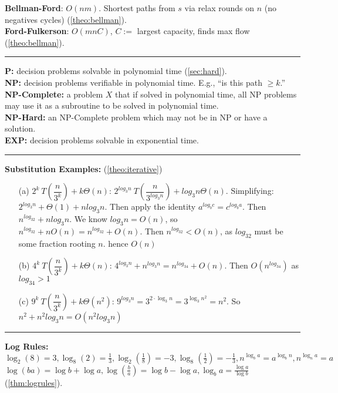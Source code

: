 \textbf{Bellman-Ford}: $O(nm)$. Shortest paths from $s$ via relax rounds on $n$ (no negatives cycles) (\ref{theo:bellman}).\\
\textbf{Ford-Fulkerson}: $O(mnC)$, $C:=$ largest capacity, finds max flow (\ref{theo:bellman}).\\
\noindent\rule{\textwidth}{0.4pt}
\textbf{P:} decision problems solvable in polynomial time (\ref{sec:hard}).\\
\textbf{NP:} decision problems verifiable in polynomial time. E.g., ``is this path $\geq k$.''\\
\textbf{NP-Complete:} a problem $X$ that if solved in polynomial time, all NP problems may use it as a subroutine to be solved in polynomial time.\\
\textbf{NP-Hard:} an NP-Complete problem which may not be in NP or have a solution.\\
\textbf{EXP:} decision problems solvable in exponential time.\\
\noindent\rule{\textwidth}{0.4pt}
\textbf{Substitution Examples:} (\ref{theo:iterative})

\vspace{-.5em}
\begin{itemize}
    \item[(a)] $2^{k}\ T \left(\dfrac{n}{3^k} \right)+k \Theta(n)$: $2^{log_3n}\ T \left(\dfrac{n}{3^{log_3n}} \right)+log_3n \Theta(n)$.
    Simplifying: $2^{log_3n}+\Theta(1)+nlog_3n$. Then apply the identity $a^{log_bc}=c^{log_ba}$.
    Then $n^{log_32}+nlog_3n$. We know $log_3n=O(n)$, so $n^{log_32}+nO(n)=n^{log_32}+O(n)$.
    Then $n^{log_32}<O(n)$, as $log_32$ must be some fraction rooting $n$. hence $O(n)$

    \item[(b)] $4^{k}\ T \left(\dfrac{n}{3^k} \right)+k \Theta(n)$: $4^{log_3n}+n^{log_3n}=n^{log_34}+O(n)$. Then $O(n^{log_34})$ as $log_34>1$
    \item[(c)]  $9^{k}\ T \left(\dfrac{n}{3^k} \right)+k \Theta(n^2)$: $9^{log_3n}=3^{2\cdot\log_3n}=3^{\log_3n^2}=n^2$.
    So $n^2+n^2log_3n = O(n^2log_3n) $
\end{itemize}
\noindent\rule{\textwidth}{0.4pt}
\textbf{Log Rules:} $\log_2(8)=3,\log_8(2)=\frac{1}{3},\log_2(\frac{1}{8})=-3, \log_8(\frac{1}{2})=-\frac{1}{3},n^{\log_ba}=a^{\log_bn},n^{\log_na}=a$\\

\vspace{-1em}
\noindent
$\log(ba)=\log b+\log a,\log(\frac{b}{a})=\log b-\log a,\log_ba=\frac{\log a}{\log b}$ (\ref{thm:logrules}).




